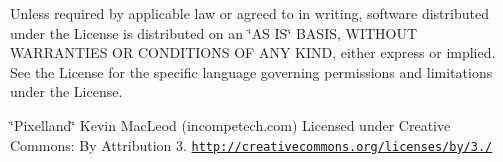 Unless required by applicable law or agreed to in writing, software distributed under the License is distributed on an \char`\"{}\+A\+S I\+S\char`\"{} B\+A\+S\+IS, W\+I\+T\+H\+O\+UT W\+A\+R\+R\+A\+N\+T\+I\+ES OR C\+O\+N\+D\+I\+T\+I\+O\+NS OF A\+NY K\+I\+ND, either express or implied. See the License for the specific language governing permissions and limitations under the License.

\char`\"{}\+Pixelland\char`\"{} Kevin Mac\+Leod (incompetech.\+com) Licensed under Creative Commons\+: By Attribution 3. \href{http://creativecommons.org/licenses/by/3.0/}{\tt http\+://creativecommons.\+org/licenses/by/3./} 